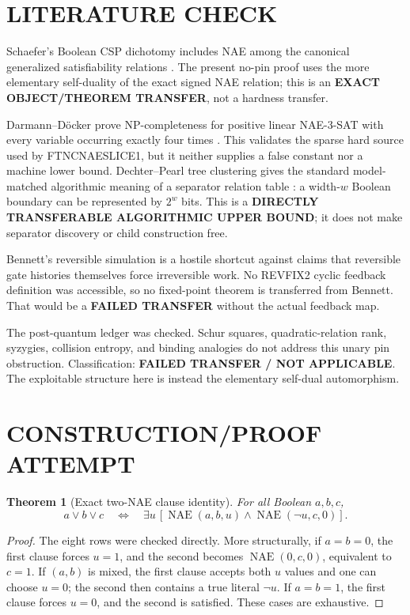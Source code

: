 \documentclass[11pt]{article}
\newtheorem{theorem}{Theorem}
\begin{document}
\section{LITERATURE CHECK}
Schaefer's Boolean CSP dichotomy includes NAE among the canonical generalized
satisfiability relations \cite{Schaefer78}.  The present no-pin proof uses the
more elementary self-duality of the exact signed NAE relation; this is an
\textbf{EXACT OBJECT/THEOREM TRANSFER}, not a hardness transfer.

Darmann--D\"ocker prove NP-completeness for positive linear NAE-3-SAT with
every variable occurring exactly four times \cite{DD20}.  This validates the
sparse hard source used by FTNCNAESLICE1, but it neither supplies a false
constant nor a machine lower bound.  Dechter--Pearl tree clustering gives the
standard model-matched algorithmic meaning of a separator relation table
\cite{DP89}: a width-$w$ Boolean boundary can be represented by $2^w$ bits.
This is a \textbf{DIRECTLY TRANSFERABLE ALGORITHMIC UPPER BOUND}; it does not
make separator discovery or child construction free.

Bennett's reversible simulation \cite{Bennett73} is a hostile shortcut against
claims that reversible gate histories themselves force irreversible work.
No REVFIX2 cyclic feedback definition was accessible, so no fixed-point theorem
is transferred from Bennett.  That would be a \textbf{FAILED TRANSFER} without
the actual feedback map.

The post-quantum ledger was checked.  Schur squares, quadratic-relation rank,
syzygies, collision entropy, and binding analogies do not address this unary
pin obstruction.  Classification: \textbf{FAILED TRANSFER / NOT APPLICABLE}.
The exploitable structure here is instead the elementary self-dual automorphism.

\section{CONSTRUCTION/PROOF ATTEMPT}
\begin{theorem}[Exact two-NAE clause identity]
For all Boolean $a,b,c$,
\[
a\vee b\vee c\quad\Longleftrightarrow\quad
\exists u\,[\operatorname{NAE}(a,b,u)\wedge
\operatorname{NAE}(\neg u,c,0)].
\]
\end{theorem}
\begin{proof}
The eight rows were checked directly.  More structurally, if $a=b=0$, the
first clause forces $u=1$, and the second becomes
$\operatorname{NAE}(0,c,0)$, equivalent to $c=1$.  If $(a,b)$ is mixed,
the first clause accepts both $u$ values and one can choose $u=0$; the second
then contains a true literal $\neg u$.  If $a=b=1$, the first clause forces
$u=0$, and the second is satisfied.  These cases are exhaustive.
\end{proof}
\end{document}
